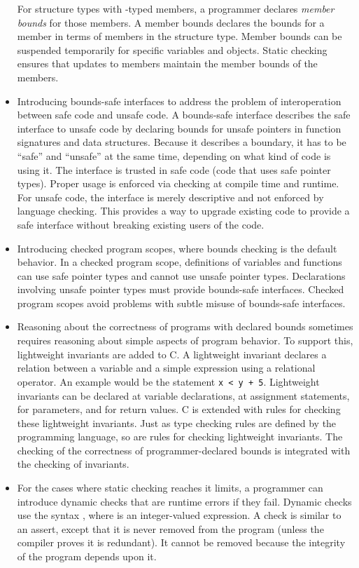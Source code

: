 \begin{itemize}
  For structure types with \arrayptr -typed members, a
  programmer declares \emph{member bounds} for those members. A member
  bounds declares the bounds for a member in terms of members in the
  structure type. Member bounds can be suspended temporarily for
  specific variables and objects. Static checking ensures that updates
  to members maintain the member bounds of the members.
\item
  Introducing bounds-safe interfaces to address the problem of
  interoperation between safe code and unsafe code. A bounds-safe
  interface describes the safe interface to unsafe code by declaring
  bounds for unsafe pointers in function signatures and data structures.
  Because it describes a boundary, it has to be ``safe'' and ``unsafe''
  at the same time, depending on what kind of code is using it. The
  interface is trusted in safe code (code that uses safe pointer types).
  Proper usage is enforced via checking at compile time and runtime. For
  unsafe code, the interface is merely descriptive and not enforced by
  language checking. This provides a way to upgrade existing code to
  provide a safe interface without breaking existing users of the code.
\item
  Introducing checked program scopes, where bounds checking is the
  default behavior. In a checked program scope, definitions of variables
  and functions can use safe pointer types and cannot use unsafe pointer
  types. Declarations involving unsafe pointer types must provide
  bounds-safe interfaces. Checked program scopes avoid problems with
  subtle misuse of bounds-safe interfaces.
\item
  Reasoning about the correctness of programs with declared bounds
  sometimes requires reasoning about simple aspects of program behavior.
  To support this, lightweight invariants are added to C. A lightweight
  invariant declares a relation between a variable and a simple
  expression using a relational operator. An example would be the
  statement \texttt{x < y + 5}. Lightweight invariants can be
  declared at variable declarations, at assignment statements, for
  parameters, and for return values. C is extended with rules for
  checking these lightweight invariants. Just as type checking rules are
  defined by the programming language, so are rules for checking
  lightweight invariants. The checking of the correctness of
  programmer-declared bounds is integrated with the checking of
  invariants.
\item
  For the cases where static checking reaches it limits, a programmer
  can introduce dynamic checks that are runtime errors if they fail.
  Dynamic checks use the syntax  , where  is an
  integer-valued expression. A check is similar to an assert, except
  that it is never removed from the program (unless the compiler proves
  it is redundant). It cannot be removed because the integrity of the
  program depends upon it.
\end{itemize}

